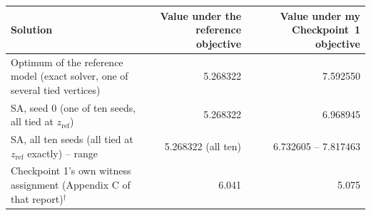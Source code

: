 \documentclass[11pt,a4paper]{article}
\newcommand{\zref}{z_{\mathrm{ref}}}
\begin{document}
\begin{tabularx}{\textwidth}{@{}Xrr@{}}
\toprule
Solution & Value under the reference objective & Value under my Checkpoint~1 objective\\
\midrule
Optimum of the reference model (exact solver, one of several tied vertices) & 5.268322 & 7.592550\\
SA, seed 0 (one of ten seeds, all tied at $\zref$) & 5.268322 & 6.968945\\
SA, all ten seeds (all tied at $\zref$ exactly) -- range & 5.268322 (all ten) & 6.732605 -- 7.817463\\
Checkpoint 1's own witness assignment (Appendix C of that report)$^\dagger$ & 6.041 & 5.075\\
\bottomrule
\end{tabularx}


\begin{sloppypar}\end{sloppypar}
\end{document}
